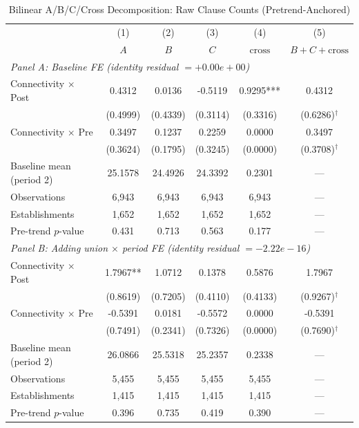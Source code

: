 \begin{table}[H]
\centering
\caption{Bilinear A/B/C/Cross Decomposition: Raw Clause Counts (Pretrend-Anchored)}
\label{tab:dotprod_raw_decomposition}
\scriptsize
\setlength{\tabcolsep}{6pt}
\begin{tabular}{lccccc}
\hline\hline
 & (1) & (2) & (3) & (4) & (5) \\
 & \textbf{$A$} & \textbf{$B$} & \textbf{$C$} & \textbf{$\text{cross}$} & \textbf{$B{+}C{+}\text{cross}$} \\
\hline
\multicolumn{6}{l}{\textit{Panel A: Baseline FE \quad (identity residual $= +0.00e+00$)}} \\
Connectivity $\times$ Post & 0.4312 & 0.0136 & -0.5119 & 0.9295*** & 0.4312 \\
 & (0.4999) & (0.4339) & (0.3114) & (0.3316) & (0.6286)$^\dagger$ \\
Connectivity $\times$ Pre & 0.3497 & 0.1237 & 0.2259 & 0.0000 & 0.3497 \\
 & (0.3624) & (0.1795) & (0.3245) & (0.0000) & (0.3708)$^\dagger$ \\
Baseline mean (period 2) & 25.1578 & 24.4926 & 24.3392 & 0.2301 & --- \\
Observations & 6,943 & 6,943 & 6,943 & 6,943 & --- \\
Establishments & 1,652 & 1,652 & 1,652 & 1,652 & --- \\
Pre-trend $p$-value & 0.431 & 0.713 & 0.563 & 0.177 & --- \\
\hline
\multicolumn{6}{l}{\textit{Panel B: Adding union $\times$ period FE \quad (identity residual $= -2.22e-16$)}} \\
Connectivity $\times$ Post & 1.7967** & 1.0712 & 0.1378 & 0.5876 & 1.7967 \\
 & (0.8619) & (0.7205) & (0.4110) & (0.4133) & (0.9267)$^\dagger$ \\
Connectivity $\times$ Pre & -0.5391 & 0.0181 & -0.5572 & 0.0000 & -0.5391 \\
 & (0.7491) & (0.2341) & (0.7326) & (0.0000) & (0.7690)$^\dagger$ \\
Baseline mean (period 2) & 26.0866 & 25.5318 & 25.2357 & 0.2338 & --- \\
Observations & 5,455 & 5,455 & 5,455 & 5,455 & --- \\
Establishments & 1,415 & 1,415 & 1,415 & 1,415 & --- \\
Pre-trend $p$-value & 0.396 & 0.735 & 0.419 & 0.390 & --- \\
\hline
\hline\hline
\end{tabular}

\end{table}
